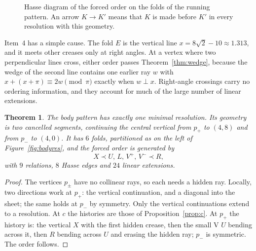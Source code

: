 \documentclass[11pt]{article}
\newtheorem{theorem}{Theorem}
\theoremstyle{definition}
\theoremstyle{remark}
\begin{document}
\begin{figure}[t]
\centering
{}
\caption{Hasse diagram of the forced order on the folds of the running pattern. An arrow $K\to K'$ means that $K$ is made before $K'$ in every resolution with this geometry.}
\label{fig:hasse1}
\end{figure}

Item~4 has a simple cause. The fold $E$ is the vertical line $x=8\sqrt2-10\approx1.313$, and it meets other creases only at right angles. At a vertex where two perpendicular lines cross, either order passes Theorem~\ref{thm:wedge}, because the wedge of the second line contains one earlier ray $w$ with $x+(x+\pi)\equiv2w\pmod\pi$ exactly when $w\perp x$. Right-angle crossings carry no ordering information, and they account for much of the large number of linear extensions.

\begin{theorem}\label{thm:body}
The body pattern has exactly one minimal resolution. Its geometry is two cancelled segments, continuing the central vertical from $p_+$ to $(4,8)$ and from $p_-$ to $(4,0)$. It has $6$ folds, partitioned as on the left of Figure~\ref{fig:bodyres}, and the forced order is generated by
\[
X\prec U,\,L,\,V^+,\,V^-\prec R,
\]
with $9$ relations, $8$ Hasse edges and $24$ linear extensions.
\end{theorem}

\begin{proof}
The vertices $p_\pm$ have no collinear rays, so each needs a hidden ray. Locally, two directions work at $p_+$: the vertical continuation, and a diagonal into the sheet; the same holds at $p_-$ by symmetry. Only the vertical continuations extend to a resolution. At $c$ the histories are those of Proposition~\ref{prop:c}. At $p_+$ the history is: the vertical $X$ with the first hidden crease, then the small V $U$ bending across it, then $R$ bending across $U$ and erasing the hidden ray; $p_-$ is symmetric. The order follows.
\end{proof}
\end{document}
